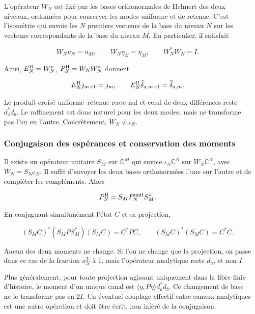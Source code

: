 L'opérateur \(W_N\) est fixé par les bases orthonormales de Helmert
des deux niveaux, ordonnées pour conserver les modes uniforme et de
retenue. C'est l'isométrie qui envoie les \(N\) premiers vecteurs de la
base du niveau \(N\) sur les vecteurs correspondants de la base du niveau \(M\).
En particulier, il satisfait

\begin{equation}
W_Nu_N=u_M,\qquad W_N\eta_N=\eta_M,\qquad W_N^*W_N=I.
\label{gamma-add-display-12}
\end{equation}

Ainsi, \(E_N^{\rm H}=W_N^*\), \(P_N^{\rm H}=W_NW_N^*\) donnent

\begin{equation}
E_N^{\rm H}j_{m+1}=j_m,\qquad
E_N^{\rm H}\widehat\delta_{a,m+1}=\widehat\delta_{a,m}.
\label{gamma-add-eq-5}
\end{equation}

Le produit croisé uniforme--retenue reste nul et celui de deux différences reste \(d_a^*d_b\). Le raffinement est donc naturel pour les deux modes, mais ne transforme pas l'un en l'autre. Concrètement, \(W_N\ne\iota_N\).

\subsubsection{Conjugaison des espérances et conservation des moments}
\label{gamma-add-sub-174}

Il existe un opérateur unitaire \(S_M\) sur \(\mathbb C^M\) qui envoie \(\iota_N\mathbb C^N\) sur \(W_N\mathbb C^N\), avec \(W_N=S_M\iota_N\). Il suffit d'envoyer les deux bases orthonormées l'une sur l'autre et de compléter les compléments. Alors

\begin{equation}
P_N^{\rm H}=S_MP_N^{\rm unif}S_M^*.
\label{gamma-add-display-14}
\end{equation}

En conjuguant simultanément l'état \(C\) et sa projection,

\begin{equation}
(S_MC)^*(S_MP S_M^*)(S_MC)=C^*PC,\qquad
(S_MC)^*(S_MC)=C^*C.
\label{gamma-add-eq-6}
\end{equation}

Aucun des deux moments ne change. Si l'on ne change que la projection, on passe dans ce cas de la fraction \(a_N^2\) à \(1\), mais l'opérateur analytique reste \(d_a\), et non \(I\).

Plus généralement, pour toute projection agissant uniquement dans la fibre finie d'histoire, le moment d'un unique canal est
\(\langle\eta,P\eta\rangle d_a^*d_b\). Ce changement de base ne le transforme pas en \(2I\). Un éventuel couplage effectif entre canaux analytiques est une autre opération et doit être écrit, non inféré de la conjugaison.


